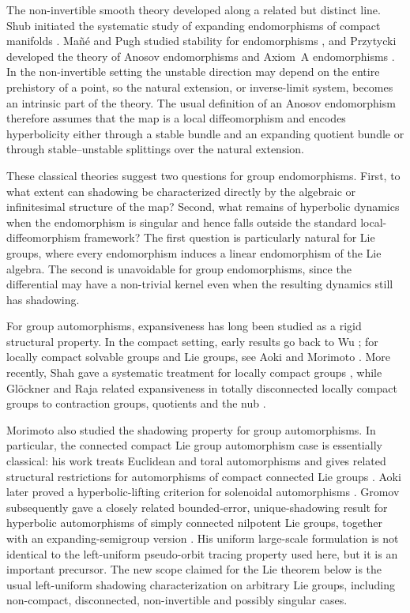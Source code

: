 \documentclass[12pt]{amsart}
\theoremstyle{definition}
\numberwithin{equation}{section}
\theoremstyle{remark}
\begin{document}
The non-invertible smooth theory developed along a related but distinct
line. Shub initiated the systematic study of expanding endomorphisms of
compact manifolds \cite{Shub1969}. Ma\~n\'e and Pugh studied stability for
endomorphisms \cite{ManePugh1975}, and Przytycki developed the theory of
Anosov endomorphisms and Axiom~A endomorphisms \cite{Przytycki1976}. In the
non-invertible setting the unstable direction may depend on the entire
prehistory of a point, so the natural extension, or inverse-limit system,
becomes an intrinsic part of the theory. The usual definition of an Anosov
endomorphism therefore assumes that the map is a local diffeomorphism and
encodes hyperbolicity either through a stable bundle and an expanding
quotient bundle or through stable--unstable splittings over the natural
extension.

These classical theories suggest two questions for group endomorphisms.
First, to what extent can shadowing be characterized directly by the
algebraic or infinitesimal structure of the map? Second, what remains of
hyperbolic dynamics when the endomorphism is singular and hence falls
outside the standard local-diffeomorphism framework? The first question is
particularly natural for Lie groups, where every endomorphism induces a
linear endomorphism of the Lie algebra. The second is unavoidable for group
endomorphisms, since the differential may have a non-trivial kernel even
when the resulting dynamics still has shadowing.

For group automorphisms, expansiveness has long been studied as a rigid
structural property. In the compact setting, early results go back to Wu
\cite{Wu1966}; for locally compact solvable groups and Lie groups, see Aoki
\cite{Aoki1979} and Morimoto \cite{Morimoto1981}. More recently, Shah gave
a systematic treatment for locally compact groups \cite{Shah2020}, while
Gl\"ockner and Raja related expansiveness in totally disconnected locally
compact groups to contraction groups, quotients and the nub
\cite{GlocknerRaja2017,WillisNub}.

Morimoto also studied the shadowing
property for group automorphisms. In particular, the connected compact Lie
group automorphism case is essentially classical: his work treats Euclidean
and toral automorphisms and gives related structural restrictions for
automorphisms of compact connected Lie groups \cite{Morimoto1981}. Aoki later
proved a hyperbolic-lifting criterion for solenoidal automorphisms
\cite[Theorem~2]{AokiSolenoidal1983}. Gromov subsequently gave a
closely related bounded-error, unique-shadowing result for hyperbolic
automorphisms of simply connected nilpotent Lie groups, together with an
expanding-semigroup version \cite[\S2.3]{Gromov2012}. His uniform large-scale
formulation is not identical to the left-uniform pseudo-orbit tracing
property used here, but it is an important precursor. The new scope claimed
for the Lie theorem below is the usual left-uniform shadowing
characterization on arbitrary Lie groups, including non-compact,
disconnected, non-invertible and possibly singular cases.
\end{document}

